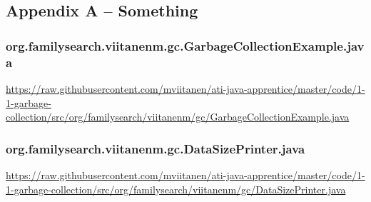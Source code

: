 \subsection*{Appendix A -- Something} \label{App:AppendixA}

\subsubsection*{org.familysearch.viitanenm.gc.GarbageCollectionExample.java}
\noindent\begin{minipage}{.6in}
\end{minipage}
\begin{minipage}{6in}
  \url{https://raw.githubusercontent.com/mviitanen/ati-java-apprentice/master/code/1-1-garbage-collection/src/org/familysearch/viitanenm/gc/GarbageCollectionExample.java}
\end{minipage}

\vspace{1em}
\subsubsection*{org.familysearch.viitanenm.gc.DataSizePrinter.java}
\noindent\begin{minipage}{.6in}
    \end{minipage}
    \begin{minipage}{6in}    
      \url{https://raw.githubusercontent.com/mviitanen/ati-java-apprentice/master/code/1-1-garbage-collection/src/org/familysearch/viitanenm/gc/DataSizePrinter.java}
    \end{minipage}